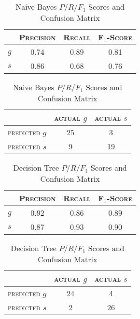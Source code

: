 \begin{table}[ht]
\begin{minipage}[b]{0.45\linewidth}\centering
\begin{tabular}{ c | c  c  c }
	& \textsc{Precision} & \textsc{Recall} & \textsc{F$_1$-Score} \\
	\hline
	\textsc{$g$} 	& 0.74 & 0.89 & 0.81 \\
	\textsc{$s$}	& 0.86 & 0.68 & 0.76
\end{tabular}
\end{minipage}
\hspace{0.5cm}
\begin{minipage}[b]{0.45\linewidth}
\centering
\begin{tabular}{ c | c  c }
	 & \textsc{actual $g$} & \textsc{actual $s$} \\
	\hline
	\textsc{predicted $g$} 	& 25 & 3 \\
	\textsc{predicted $s$}		& 9 & 19
\end{tabular}
\end{minipage}
\caption{Naive Bayes $P/R/F_1$ Scores and Confusion Matrix}
\end{table}

\begin{table}[ht]
\begin{minipage}[b]{0.45\linewidth}\centering
\begin{tabular}{ c | c  c  c }
	& \textsc{Precision} & \textsc{Recall} & \textsc{F$_1$-Score} \\
	\hline
	\textsc{$g$} 	& 0.92 & 0.86 & 0.89 \\
	\textsc{$s$}	& 0.87 & 0.93 & 0.90
\end{tabular}
\end{minipage}
\hspace{0.5cm}
\begin{minipage}[b]{0.45\linewidth}
\centering
\begin{tabular}{ c | c  c }
	 & \textsc{actual $g$} & \textsc{actual $s$} \\
	\hline
	\textsc{predicted $g$} 	& 24 & 4 \\
	\textsc{predicted $s$}		& 2 & 26
\end{tabular}
\end{minipage}
\caption{Decision Tree $P/R/F_1$ Scores and Confusion Matrix}
\end{table}
\newpage

